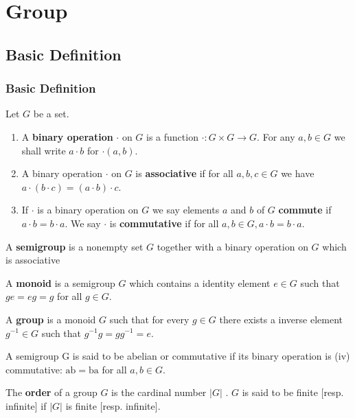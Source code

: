 \chapter{Group}

\section{Basic Definition} %
\subsection{Basic Definition} %
\begin{definition}
    Let $G$ be a set.
    \begin{enumerate}
        \item
              A \textbf{binary operation} $\cdot$ on $G$ is a function $\cdot: G \times G \rightarrow G$. For any $a, b \in G$ we shall write $a \cdot b$ for $\cdot(a, b)$.

        \item
              A binary operation $\cdot$ on $G$ is \textbf{associative} if for all $a, b, c \in G$ we have $a \cdot(b \cdot c)=(a \cdot b) \cdot c$.

        \item
              If $\cdot$ is a binary operation on $G$ we say elements $a$ and $b$ of $G$ \textbf{commute} if $a \cdot b=b \cdot a$. We say $\cdot$ is \textbf{commutative} if for all $a, b \in G, a \cdot b=b \cdot a$.
    \end{enumerate}
\end{definition}

\begin{definition}
    A \textbf{semigroup} is a nonempty set $G$ together with a binary operation on $G$ which is associative

    A \textbf{monoid} is a semigroup $G$ which contains a identity element $e \in G$ such that $ge=eg=g$ for all $g \in G$.

    A \textbf{group} is a monoid $G$ such that for every $g \in G$ there exists a inverse element $g^{-1} \in G$ such that $g^{-1} g=g g^{-1}=e$.

    A semigroup G is said to be abelian or commutative if its binary operation is
    (iv) commutative: $\mathrm{ab}=\mathrm{ba}$ for all $a, b \in G$.

    The \textbf{order} of a group $G$ is the cardinal number $\left|G\right|$ .
    $ G$ is said to be finite [resp. infinite] if $|G|$ is finite [resp. infinite].
\end{definition}


